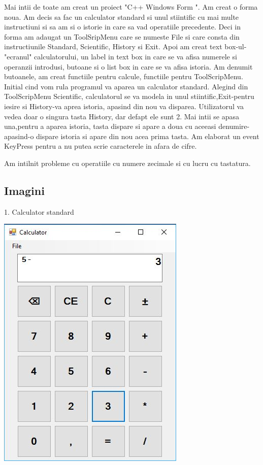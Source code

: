 Mai intii de toate am creat un proiect "C++ Windows Form ". Am creat o forma noua. Am decis sa fac un calculator standard si unul stiintific cu mai multe instructiuni si sa am si o istorie in care sa vad operatiile precedente. Deci in forma am adaugat un ToolSripMenu care se numeste File si care consta din instructiunile Standard, Scientific, History si Exit. Apoi am creat text box-ul-"ecranul" calculatorului, un label in text box in care se va afisa numerele si operanzii introdusi, butoane si o list box in care se va afisa istoria. Am denumit butoanele, am creat functiile pentru calcule, functiile pentru ToolScripMenu. Initial cind vom rula programul va aparea un calculator standard. Alegind din ToolScripMenu Scientific, calculatorul se va modela in unul stiintific,Exit-pentru iesire si History-va aprea istoria, apasind din nou va disparea. Utilizatorul va vedea doar o singura tasta History, dar defapt ele sunt 2. Mai intii se apasa una,pentru a aparea istoria, tasta dispare si apare a doua cu aceeasi denumire-apasind-o dispare istoria si apare din nou acea prima tasta. Am elaborat un event KeyPress pentru a nu putea scrie caracterele in afara de cifre.

Am intilnit probleme cu operatiile cu numere zecimale si cu lucru cu tastatura.  
 



\subsection{Imagini}



1. Calculator standard

\includegraphics{Cattura.JPG}

